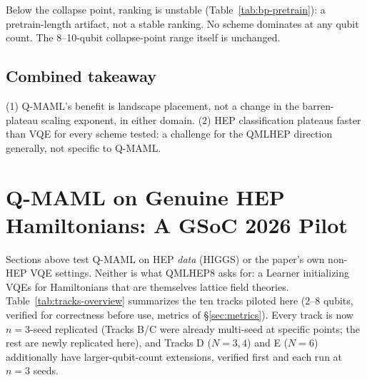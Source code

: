 \documentclass[11pt]{article}
\begin{document}
Below the collapse point, ranking is unstable (Table~\ref{tab:bp-pretrain}): a pretrain-length artifact, not
a stable ranking. No scheme dominates at any qubit count. The 8--10-qubit collapse-point range itself is
unchanged.

\subsection{Combined takeaway}
\label{sec:bp-combined}
(1) Q-MAML's benefit is landscape placement, not a change in the barren-plateau scaling exponent, in either
domain. (2) HEP classification plateaus faster than VQE for every scheme tested: a challenge for the QMLHEP
direction generally, not specific to Q-MAML.

\FloatBarrier
\section{Q-MAML on Genuine HEP Hamiltonians: A GSoC 2026 Pilot}
\label{sec:genuine-hep}

Sections above test Q-MAML on HEP \emph{data} (HIGGS) or the paper's own non-HEP VQE settings. Neither is
what QMLHEP8 asks for: a Learner initializing VQEs for Hamiltonians that are themselves lattice field
theories. Table~\ref{tab:tracks-overview} summarizes the ten tracks piloted here (2--8 qubits, verified for
correctness before use, metrics of \S\ref{sec:metrics}). Every track is now $n{=}3$-seed
replicated (Tracks B/C were already multi-seed at specific points; the rest are newly replicated here),
and Tracks D ($N{=}3,4$) and E ($N{=}6$) additionally have larger-qubit-count extensions, verified first and
each run at $n{=}3$ seeds.
\end{document}
